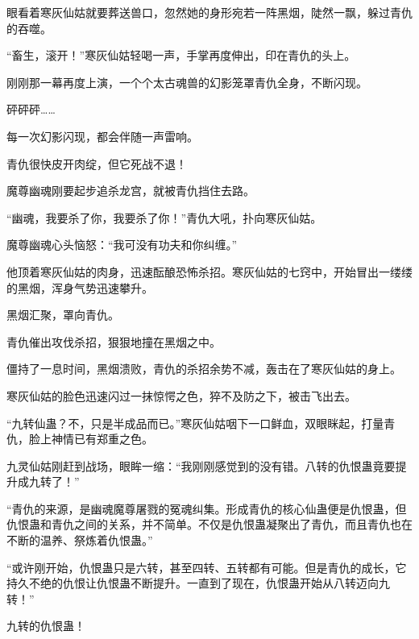 \begin{this_body}
眼看着寒灰仙姑就要葬送兽口，忽然她的身形宛若一阵黑烟，陡然一飘，躲过青仇的吞噬。

“畜生，滚开！”寒灰仙姑轻喝一声，手掌再度伸出，印在青仇的头上。

刚刚那一幕再度上演，一个个太古魂兽的幻影笼罩青仇全身，不断闪现。

砰砰砰……

每一次幻影闪现，都会伴随一声雷响。

青仇很快皮开肉绽，但它死战不退！

魔尊幽魂刚要起步追杀龙宫，就被青仇挡住去路。

“幽魂，我要杀了你，我要杀了你！”青仇大吼，扑向寒灰仙姑。

魔尊幽魂心头恼怒：“我可没有功夫和你纠缠。”

他顶着寒灰仙姑的肉身，迅速酝酿恐怖杀招。寒灰仙姑的七窍中，开始冒出一缕缕的黑烟，浑身气势迅速攀升。

黑烟汇聚，罩向青仇。

青仇催出攻伐杀招，狠狠地撞在黑烟之中。

僵持了一息时间，黑烟溃败，青仇的杀招余势不减，轰击在了寒灰仙姑的身上。

寒灰仙姑的脸色迅速闪过一抹惊愕之色，猝不及防之下，被击飞出去。

“九转仙蛊？不，只是半成品而已。”寒灰仙姑咽下一口鲜血，双眼眯起，打量青仇，脸上神情已有郑重之色。

九灵仙姑刚赶到战场，眼眸一缩：“我刚刚感觉到的没有错。八转的仇恨蛊竟要提升成九转了！”

“青仇的来源，是幽魂魔尊屠戮的冤魂纠集。形成青仇的核心仙蛊便是仇恨蛊，但仇恨蛊和青仇之间的关系，并不简单。不仅是仇恨蛊凝聚出了青仇，而且青仇也在不断的温养、祭炼着仇恨蛊。”

“或许刚开始，仇恨蛊只是六转，甚至四转、五转都有可能。但是青仇的成长，它持久不绝的仇恨让仇恨蛊不断提升。一直到了现在，仇恨蛊开始从八转迈向九转！”

九转的仇恨蛊！

\end{this_body}

